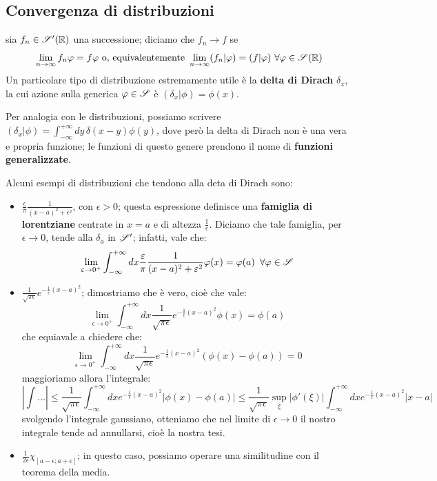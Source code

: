 \subsection{Convergenza di distribuzioni}
sia $f_n \in \S'(\R)$ una successione; diciamo che $f_n \to f$ se 
$$\lim_{n \to \infty} f_n \phi =f \phi \text{ o, equivalentemente } \lim_{n \to \infty} (f_n|\phi) =(f|\phi) \, \, \forall \phi \in \S(\R) $$
Un particolare tipo di distribuzione estremamente utile è la \textbf{delta di Dirach} $\delta_x$, la cui azione sulla generica $\phi \in \S$ è $(\delta_x|\phi)=\phi(x)$.
\begin{osservazione}
Per analogia con le distribuzioni, possiamo scrivere $(\delta_x|\phi)=\int_{-\infty} ^{+\infty} dy \, \delta(x-y) \phi(y)$, dove però la delta di Dirach non è una vera e propria funzione; le funzioni di questo genere prendono il nome di \textbf{funzioni generalizzate}.
\end{osservazione}
Alcuni esempi di distribuzioni che tendono alla deta di Dirach sono:
\begin{itemize}
\item $\frac{\epsilon}{\pi} \frac{1}{(x-a)^2 + \epsilon^2}$, con $\epsilon>0$; questa espressione definisce una \textbf{famiglia di lorentziane} centrate in $x=a$ e di altezza $\frac{1}{\epsilon}$. Diciamo che tale famiglia, per $\epsilon \to 0$, tende alla $\delta_a$ in $\S'$; infatti, vale che:
$$\lim_{\epsilon \to 0^+} \int_{-\infty} ^{+\infty} dx \frac{\epsilon}{\pi} \frac{1}{(x-a)^2 + \epsilon^2} \phi(x)= \phi(a) \, \, \, \forall \phi \in \S$$
\item $\frac{1}{\sqrt{\pi \epsilon}} e^{ -\frac{1}{\epsilon} (x-a)^2}$; dimostriamo che è vero, cioè che vale:
$$\lim_{\epsilon \to 0^+} \int_{-\infty} ^{+\infty} dx \frac{1}{\sqrt{\pi \epsilon}} e^{ -\frac{1}{\epsilon} (x-a)^2} \phi(x)=\phi(a)$$
che equiavale a chiedere che:
$$\lim_{\epsilon \to 0^+} \int_{-\infty} ^{+\infty} dx \frac{1}{\sqrt{\pi \epsilon}} e^{ -\frac{1}{\epsilon} (x-a)^2}\left( \phi(x)-\phi(a) \right) =0$$
maggioriamo allora l'integrale:
$$\left| \int \dots \right| \leq \frac{1}{\sqrt{\pi \epsilon}} \int_{-\infty} ^{+\infty} dx e^{ -\frac{1}{\epsilon} (x-a)^2}\left| \phi(x)-\phi(a) \right| \leq \frac{1}{\sqrt{\pi \epsilon}} \sup_{\xi} |\phi'(\xi)| \int_{-\infty} ^{+\infty} dx e^{ -\frac{1}{\epsilon} (x-a)^2} |x-a|$$
svolgendo l'integrale gaussiano, otteniamo che nel limite di $\epsilon \to 0$ il nostro integrale tende ad annullarsi, cioè la nostra tesi.
\item $\frac{1}{2 \epsilon} \chi_{[a-\epsilon;a+\epsilon]}$; in questo caso, possiamo operare una similitudine con il teorema della media.
\end{itemize}
